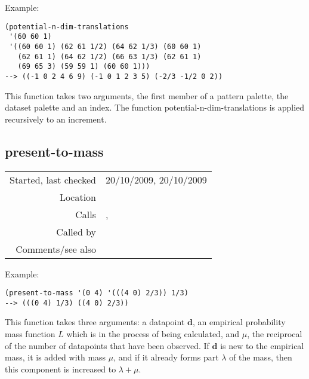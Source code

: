 \vspace{0.5cm}
\noindent Example:
\begin{verbatim}
(potential-n-dim-translations
 '(60 60 1)
 '((60 60 1) (62 61 1/2) (64 62 1/3) (60 60 1)
   (62 61 1) (64 62 1/2) (66 63 1/3) (62 61 1)
   (69 65 3) (59 59 1) (60 60 1)))
--> ((-1 0 2 4 6 9) (-1 0 1 2 3 5) (-2/3 -1/2 0 2))
\end{verbatim}

\noindent This function takes two arguments, the first
member of a pattern palette, the dataset palette and
an index. The function potential-n-dim-translations is
applied recursively to an increment.


\subsection*{present-to-mass}\label{fun:present-to-mass}

\vspace{0.3cm}
\begin{tabular}{r|p{8cm}}
Started, last checked & 20/10/2009, 20/10/2009 \\
Location & \nameref{sec:empirical-preliminaries} \\
Calls & \nameref{fun:accumulate-to-mass}, \nameref{fun:add-to-mass} \\
Called by & \nameref{fun:empirical-mass} \\
Comments/see also &
\end{tabular}

\vspace{0.5cm}
\noindent Example:
\begin{verbatim}
(present-to-mass '(0 4) '(((4 0) 2/3)) 1/3)
--> (((0 4) 1/3) ((4 0) 2/3))
\end{verbatim}

\noindent This function takes three arguments: a
datapoint $\mathbf{d}$, an empirical probability mass
function $L$ which is in the process of being
calculated, and $\mu$, the reciprocal of the number of
datapoints that have been observed. If $\mathbf{d}$ is
new to the empirical mass, it is added with mass
$\mu$, and if it already forms part $\lambda$ of the
mass, then this component is increased to $\lambda +
\mu$.





















